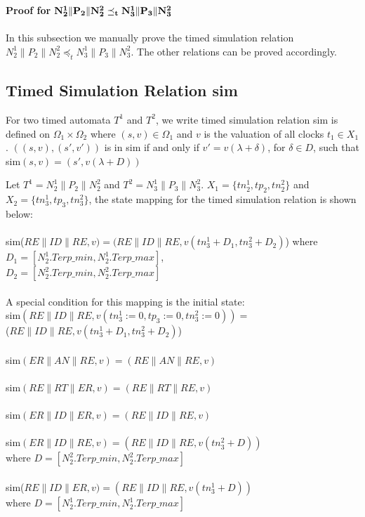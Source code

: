\section{}
\textbf{Proof for $\bf{N_2^1\| P_2\| N_2^2\preceq_t N_3^1\| P_3\| N_3^2}$}\\\\
In this subsection we manually prove the timed simulation relation $N_2^1\| P_2\| N_2^2\preceq_t N_3^1\| P_3\| N_3^2$. The other relations can be proved accordingly.
\subsection{Timed Simulation Relation \textsf{sim}}
For two timed automata $T^1$ and $T^2$, we write timed simulation relation \textsf{sim} is defined on $\Omega_1\times\Omega_2$ where $(s,v)\in\Omega_1$ and $v$ is the valuation of all clocks $t_1\in X_1$. $((s,v),(s',v'))$ is in \textsf{sim} if and only if $v'=v(\lambda+\delta)$, for $\delta\in D$, such that \textsf{sim}$(s,v)=(s',v(\lambda +D))$

Let $T^1=N_2^1\| P_2\| N_2^2$ and $T^2=N_3^1\| P_3\| N_3^2$. $X_1=\{tn_2^1,tp_2,tn_2^2\}$ and $X_2=\{tn_3^1,tp_3,tn_3^2\}$, the state mapping for the timed simulation relation is shown below:\\
\\
\textsf{sim}($RE\| ID\| RE,v)=(RE\| ID\| RE,v(tn_3^1+D_1,tn_3^2+D_2)$)
where $D_1=[N_2^1.Terp\_min,N_2^1.Terp\_max]$,\\
 $D_2=[N_2^2.Terp\_min,N_2^2.Terp\_max]$\\
\\
A special condition for this mapping is the initial state:\\
\textsf{sim}$(RE\| ID\| RE,v(tn_3^1:=0,tp_3:=0,tn_3^2:=0))=$\\ 
($RE\| ID\| RE,v(tn_3^1+D_1,tn_3^2+D_2)$)\\
\\
\textsf{sim}$(ER\| AN\| RE,v)=(RE\| AN\| RE,v)$\\
\\
\textsf{sim}$(RE\| RT\| ER,v)=(RE\| RT\| RE,v)$\\
\\
\textsf{sim}$(ER\| ID\| ER,v)=(RE\| ID\| RE,v)$\\
\\
\textsf{sim}$(ER\| ID\| RE,v)=(RE\| ID\| RE,v(tn_3^2+D))$\\
where $D=[N_2^2.Terp\_min,N_2^2.Terp\_max]$\\
\\
\textsf{sim}($RE\| ID\| ER,v)=(RE\| ID\| RE,v(tn_3^1+D))$\\
where $D=[N_2^1.Terp\_min,N_2^1.Terp\_max]$


